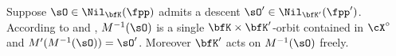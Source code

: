\documentclass[12pt,a4paper]{amsart}
\numberwithin{equation}{section}
\newtheorem{lem}[thm]{Lemma}
\theoremstyle{remark}
\def\MMP{M}
\def\Xo{\cX^\circ}
\def\lsign{{}^l\mathrm{Sign}}
\begin{document}



Suppose $\sO\in \Nil_{\bfK}(\fpp)$ admits a descent $\sO'\in
  \Nil_{\bfK'}(\fpp')$. %
  According to
  \cite[Proposition 11.1]{KP} and \cite[Lemmas~13 and 14]{Ohta},
  $\MMP^{-1}(\sO)$
  is a single
  $\bfK\times \bfK'$-orbit contained in $\Xo$ and $\MMP'(\MMP^{-1}(\sO)) =
  \sO'$. Moreover $\bfK'$ acts on $\MMP^{-1}(\sO)$ freely.
\end{document}
